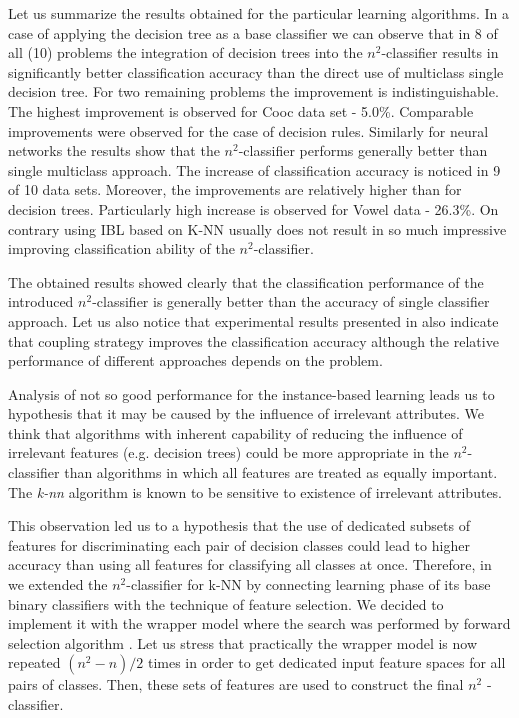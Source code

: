 \documentclass{article}
\begin{document}
Let us summarize the results obtained for the particular learning
algorithms. In a case of applying the decision tree as a base
classifier we can observe that in 8 of all (10) problems the
integration of decision trees into the $n^{2}$-classifier results
in significantly better classification accuracy than the direct
use of multiclass single decision tree. For two remaining problems
the improvement is indistinguishable. The highest improvement is
observed for Cooc data set - 5.0\%. Comparable improvements were
observed for the case of decision rules. Similarly for neural
networks the results show that the $n^{2}$-classifier performs
generally better than single multiclass approach. The increase of
classification accuracy is noticed in 9 of 10 data sets. Moreover,
the improvements are relatively higher than for decision trees.
Particularly high increase is observed for Vowel data - 26.3\%. On
contrary using IBL based on K-NN usually does not result in so
much impressive improving classification ability of the
$n^{2}$-classifier.

The obtained results showed clearly that the classification performance of
the introduced $n^2$-classifier is generally better than the accuracy of
single classifier approach. Let us also notice that experimental results
presented in \cite{Friedman,Hastie} also indicate that coupling strategy
improves the classification accuracy although the relative performance of
different approaches depends on the problem.

Analysis of not so good performance for the instance-based
learning leads us to hypothesis that it may be caused by the
influence of irrelevant attributes. We think that algorithms with
inherent capability of reducing the influence of irrelevant
features (e.g. decision trees) could be more appropriate in the
$n^2$-classifier than algorithms in which all features are treated
as equally important. The {\em k-nn} algorithm is known to be
sensitive to existence of irrelevant attributes.

This observation led us to a hypothesis that the use of dedicated subsets of
features for discriminating each pair of decision classes could lead to
higher accuracy than using all features for classifying all classes at once.
Therefore, in \cite{JelStefKr} we extended the $n^2$-classifier for k-NN by
connecting learning phase of its base binary classifiers with the technique
of feature selection. We decided to implement it with the wrapper model
where the search was performed by forward selection algorithm \cite{Kohavi95}%
. Let us stress that practically the wrapper model is now repeated $(n^2-n)/2
$ times in order to get dedicated input feature spaces for all pairs of
classes. Then, these sets of features are used to construct the final $n^2$%
-classifier.
\end{document}
